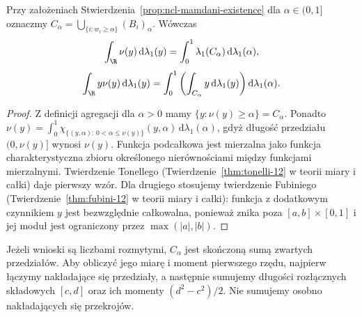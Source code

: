 \begin{stwierdzenie}
\label{prop:ncl-mamdani-layer-cake}
Przy założeniach
Stwierdzenia~\ref{prop:ncl-mamdani-existence}
dla $\alpha\in(0,1]$ oznaczmy
$C_\alpha=\bigcup_{\{i:w_i\geq\alpha\}}(B_i)_\alpha$.
Wówczas
\[
 \int_\R \nu(y)\,\mathrm d\lambda_1(y)
 =\int_0^1\lambda_1(C_\alpha)\,\mathrm d\lambda_1(\alpha),
\]
\[
 \int_\R y\nu(y)\,\mathrm d\lambda_1(y)
 =\int_0^1\left(\int_{C_\alpha}y\,\mathrm d\lambda_1(y)\right)
           \mathrm d\lambda_1(\alpha).
\]
\end{stwierdzenie}
\begin{proof}
Z definicji agregacji dla $\alpha>0$ mamy
$\{y:\nu(y)\geq\alpha\}=C_\alpha$.
Ponadto
$\nu(y)=\int_0^1\chi_{\{(y,\alpha):\,0<\alpha\leq\nu(y)\}}
(y,\alpha)\,\mathrm d\lambda_1(\alpha)$,
gdyż długość przedziału $(0,\nu(y)]$ wynosi $\nu(y)$.
Funkcja podcałkowa jest mierzalna jako funkcja
charakterystyczna zbioru określonego nierównościami
między funkcjami mierzalnymi.
Twierdzenie Tonellego (Twierdzenie~\ref{thm:tonelli-12}
w teorii miary i całki) daje pierwszy wzór.
Dla drugiego stosujemy twierdzenie Fubiniego
(Twierdzenie~\ref{thm:fubini-12} w teorii miary i całki):
funkcja z dodatkowym czynnikiem $y$ jest bezwzględnie
całkowalna, ponieważ znika poza $[a,b]\times[0,1]$
i jej moduł jest ograniczony przez $\max(|a|,|b|)$.
\end{proof}
Jeżeli wnioski są liczbami rozmytymi, $C_\alpha$
jest skończoną sumą zwartych przedziałów.
Aby obliczyć jego miarę i moment pierwszego rzędu,
najpierw łączymy nakładające się przedziały,
a następnie sumujemy długości rozłącznych składowych
$[c,d]$ oraz ich momenty $(d^2-c^2)/2$.
Nie sumujemy osobno nakładających się przekrojów.

